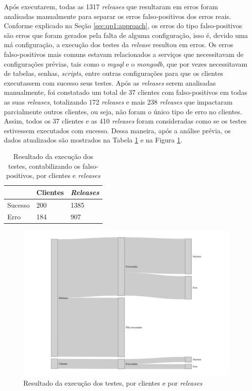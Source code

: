 Após executarem, todas as 1317 \textit{releases} que resultaram em erros foram analisadas manualmente para separar os erros falso-positivos dos erros reais. Conforme explicado na Seção \ref{sec:qp1:approach}, os erros do tipo falso-positivos são erros que foram gerados pela falta de alguma configuração, isso é, devido uma má configuração, a execução dos testes da \textit{release} resultou em erros. Os erros falso-positivos mais comuns estavam relacionados a serviços que necessitavam de configurações prévias, tais como o \textit{mysql} e o \textit{mongodb}, que por vezes necessitavam de tabelas, senhas, \textit{scripts}, entre outras configurações para que os clientes executassem com sucesso seus testes. Após as \textit{releases} serem analisadas manualmente, foi constatado um total de 37 clientes com falso-positivos em todas as suas \textit{releases}, totalizando 172 \textit{releases} e mais 238 \textit{releases} que impactaram parcialmente outros clientes, ou seja, não foram o único tipo de erro no clientes. Assim, todos os 37 clientes e as 410 \textit{releases} foram consideradas como se os testes estivessem executados com sucesso. Dessa maneira, após a análise prévia, os dados atualizados são mostrados na Tabela \ref{tab:res_rq1_2} e na Figura \ref{fig:res_rq1_g}.

\begin{table}[]
\centering
\begin{tabular}{|l|l|l|}
\hline
                    & Clientes & \textit{Releases} \\ \hline
    Sucesso         & 200     & 1385     \\
    Erro            & 184     & 907     \\ \hline
\end{tabular}
\caption{Resultado da execução dos testes, contabilizando os falso-positivos, por clientes e \textit{releases}}
\label{tab:res_rq1_2}
\end{table}

\begin{figure}
    \centering
    \includegraphics[scale=0.7]{figuras/general_results.pdf}
    \caption{Resultado da execução dos testes, por clientes e por \textit{releases}}
    \label{fig:res_rq1_g}
\end{figure}{}
